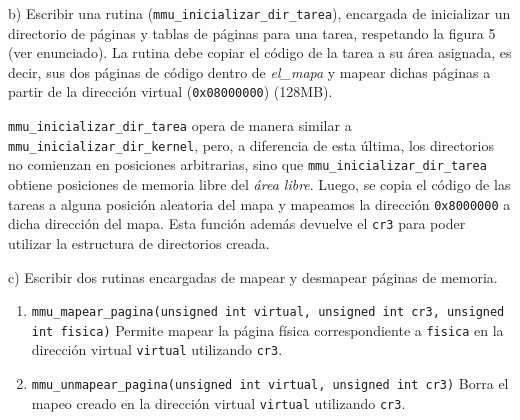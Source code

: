 \vspace*{0.5cm} \noindent



\noindent
b) Escribir una rutina (\verb|mmu_inicializar_dir_tarea|), encargada de inicializar un directorio de páginas y tablas de páginas para 
una tarea, respetando la figura 5 (ver enunciado). La rutina debe copiar el código de la tarea a su área asignada, es decir, 
sus dos páginas de código dentro de \textit{el_mapa} y mapear dichas páginas a partir de la dirección virtual (\verb|0x08000000|) (128MB).

\vspace*{0.3cm}

\verb|mmu_inicializar_dir_tarea| opera de manera similar a \verb|mmu_inicializar_dir_kernel|, pero, a diferencia 
de esta \'ultima, los directorios no comienzan en posiciones arbitrarias, sino que \verb|mmu_inicializar_dir_tarea| 
obtiene posiciones de memoria libre del \textit{\'area libre}. Luego, se copia el c\'odigo de las tareas a alguna 
posici\'on aleatoria del mapa y mapeamos la direcci\'on \verb|0x8000000| a dicha direcci\'on del mapa. Esta funci\'on adem\'as 
devuelve el \verb|cr3| para poder utilizar la estructura de directorios creada.

\vspace*{0.5cm} \noindent



\noindent
c) Escribir dos rutinas encargadas de mapear y desmapear páginas de memoria.

\begin{enumerate}
  \item \verb|mmu_mapear_pagina(unsigned int virtual, unsigned int cr3, unsigned int fisica)| \newline
  Permite mapear la página física correspondiente a \verb|fisica| en la dirección virtual \verb|virtual| utilizando \verb|cr3|.
  
  \item \verb|mmu_unmapear_pagina(unsigned int virtual, unsigned int cr3)| \newline
  Borra el mapeo creado en la dirección virtual \verb|virtual| utilizando \verb|cr3|.
\end{enumerate}

\vspace*{0.3cm}

